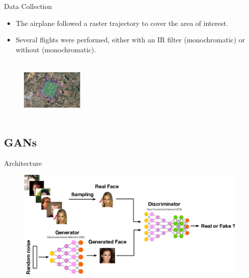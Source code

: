\begin{frame}{Data Collection}
\begin{itemize}
      \item The airplane followed a raster trajectory to cover the area of interest.
      \item Several flights were performed, either with an IR filter (monochromatic) or without (monochromatic).
  \end{itemize}
  \begin{figure}
      \centering
      \includegraphics[width=3cm, height=3cm]{../figs/data/aerial_strip.jpeg}
  \end{figure}
\end{frame}


\subsection*{GANs} \label{apndx:gan}
\begin{frame}{Architecture}
  \begin{figure}
    \centering
    \includegraphics[width=\linewidth]{../figs/related_work/gan_arch.png}
  \end{figure}  
\end{frame}

